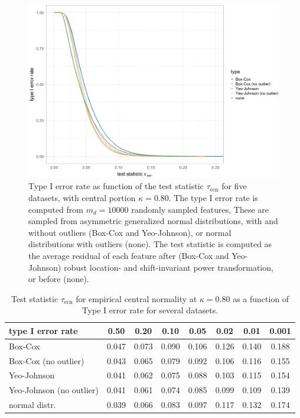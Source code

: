 \documentclass[preprint,12pt,authoryear]{elsarticle}
\begin{document}
\begin{figure}

{\centering \includegraphics[width=1\linewidth]{figure_appendix_4} 

}

\caption{Type I error rate as function of the test statistic $\tau_{\text{ecn}}$ for five datasets, with central portion $\kappa=0.80$. The type I error rate is computed from $m_d=10000$ randomly sampled features, These are sampled from asymmetric generalized normal distributions, with and without outliers (Box-Cox and Yeo-Johnson), or normal distributions with outliers (none). The test statistic is computed as the average residual of each feature after (Box-Cox and Yeo-Johnson) robust location- and shift-invariant power transformation, or before (none).}\label{fig:empirical-central-normality-test-appendix}
\end{figure}

\begin{table}
\begin{center}
\caption{Test statistic $\tau_{\text{ecn}}$ for empirical central normality at $\kappa = 0.80$ as a function of Type I error rate for several datasets.}
\label{tab:empirical-central-normality-appendix}
\begin{tabular}{l | c c c c c c c}

\toprule
type I error rate & 0.50 & 0.20 & 0.10 & 0.05 & 0.02 & 0.01 & 0.001 \\

\midrule
Box-Cox                  & 0.047 & 0.073 & 0.090 & 0.106 & 0.126 & 0.140 & 0.188 \\
Box-Cox (no outlier)     & 0.043 & 0.065 & 0.079 & 0.092 & 0.106 & 0.116 & 0.155 \\
Yeo-Johnson              & 0.041 & 0.062 & 0.075 & 0.088 & 0.103 & 0.115 & 0.154 \\
Yeo-Johnson (no outlier) & 0.041 & 0.061 & 0.074 & 0.085 & 0.099 & 0.109 & 0.139 \\
normal distr.            & 0.039 & 0.066 & 0.083 & 0.097 & 0.117 & 0.132 & 0.174 \\
\bottomrule

\end{tabular}
\end{center}
\end{table}
\end{document}
